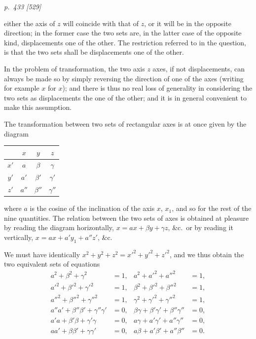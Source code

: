 \documentclass[11pt,a4paper]{book}
\begin{document}
\clearpage

\bigskip
\textit{p.~433 [529]}
\smallskip

\noindent
either the axis of $z$ will coincide with that of $z$, or it will be in the opposite
direction; in the former case the two sets are, in the latter case of the opposite kind,
displacements one of the other. The restriction referred to in the question, is that
the two sets shall be displacements one of the other.

In the problem of transformation, the two axis $z$ axes, if not displacements, can
always be made so by simply reversing the direction of one of the axes (writing for
example $x$ for $x$); and there is thus no real loss of generality in considering the
two sets as displacements the one of the other; and it is in general convenient to
make this assumption.

The transformation between two sets of rectangular axes is at once given by the
diagram

\begin{center}
\begin{tabular}{c|ccc}
   & $x$ & $y$ & $z$ \\\hline
$x'$ & $a$ & $\beta$ & $\gamma$ \\
$y'$ & $a'$ & $\beta'$ & $\gamma'$ \\
$z'$ & $a''$ & $\beta''$ & $\gamma''$ \\
\end{tabular}
\end{center}

\noindent
where $a$ is the cosine of the inclination of the axis $x$, $x_1$, and so for the rest of the
nine quantities. The relation between the two sets of axes is obtained at pleasure by
reading the diagram horizontally, $x = ax + \beta y + \gamma z$, \&c.\ or by reading it vertically,
$x = ax + a'y_1 + a''z'$, \&c.

We must have identically $x^2 + y^2 + z^2 = x'^2 + y'^2 + z'^2$, and we thus obtain the two
equivalent sets of equations
\begin{align*}
a^2 + \beta^2 + \gamma^2 &= 1,& a^2 + a'^2 + a''^2 &= 1,\\
a'^2 + \beta'^2 + \gamma'^2 &= 1,& \beta^2 + \beta'^2 + \beta''^2 &= 1,\\
a''^2 + \beta''^2 + \gamma''^2 &= 1,& \gamma^2 + \gamma'^2 + \gamma''^2 &= 1,\\
a''a' + \beta''\beta' + \gamma''\gamma' &= 0,& \beta\gamma + \beta'\gamma' + \beta''\gamma'' &= 0,\\
a'a + \beta'\beta + \gamma'\gamma &= 0,& a\gamma + a'\gamma' + a''\gamma'' &= 0,\\
a a' + \beta\beta' + \gamma\gamma' &= 0,& a\beta + a'\beta' + a''\beta'' &= 0.
\end{align*}
\end{document}
